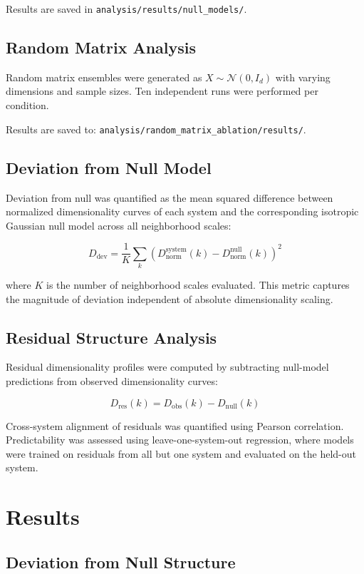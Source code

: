 Results are saved in \texttt{analysis/results/null\_models/}.

\subsection{Random Matrix Analysis}

Random matrix ensembles were generated as $X \sim \mathcal{N}(0, I_d)$ with varying dimensions and sample sizes. Ten independent runs were performed per condition.

Results are saved to: \texttt{analysis/random\_matrix\_ablation/results/}.

\subsection{Deviation from Null Model}

Deviation from null was quantified as the mean squared difference between normalized dimensionality curves of each system and the corresponding isotropic Gaussian null model across all neighborhood scales:

\[
	D_{\text{dev}} = \frac{1}{K} \sum_{k} \left( D_{\text{norm}}^{\text{system}}(k) - D_{\text{norm}}^{\text{null}}(k) \right)^2
\]

where $K$ is the number of neighborhood scales evaluated. This metric captures the magnitude of deviation independent of absolute dimensionality scaling.

\subsection{Residual Structure Analysis}

Residual dimensionality profiles were computed by subtracting null-model predictions from observed dimensionality curves:

\[
	D_{\text{res}}(k) = D_{\text{obs}}(k) - D_{\text{null}}(k)
\]

Cross-system alignment of residuals was quantified using Pearson correlation. Predictability was assessed using leave-one-system-out regression, where models were trained on residuals from all but one system and evaluated on the held-out system.

\section{Results}

\subsection{Deviation from Null Structure}

